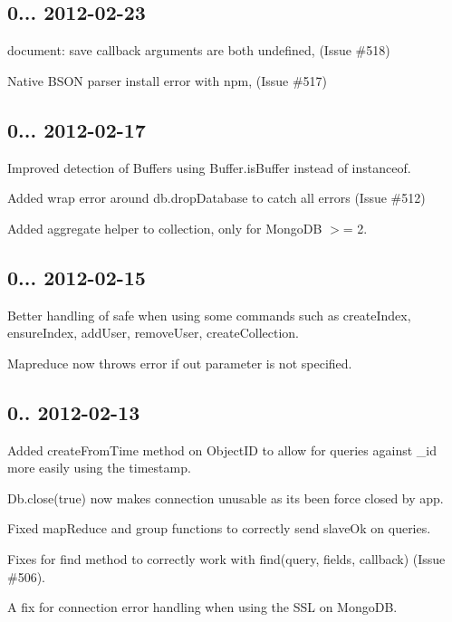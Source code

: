 \subsection*{0... 2012-\/02-\/23 }


\begin{DoxyItemize}
\item document\+: save callback arguments are both undefined, (Issue \#518)
\item Native B\+S\+ON parser install error with npm, (Issue \#517)
\end{DoxyItemize}

\subsection*{0... 2012-\/02-\/17 }


\begin{DoxyItemize}
\item Improved detection of Buffers using Buffer.\+is\+Buffer instead of instanceof.
\item Added wrap error around db.\+drop\+Database to catch all errors (Issue \#512)
\item Added aggregate helper to collection, only for Mongo\+DB $>$= 2.
\end{DoxyItemize}

\subsection*{0... 2012-\/02-\/15 }


\begin{DoxyItemize}
\item Better handling of safe when using some commands such as create\+Index, ensure\+Index, add\+User, remove\+User, create\+Collection.
\item Mapreduce now throws error if out parameter is not specified.
\end{DoxyItemize}

\subsection*{0.. 2012-\/02-\/13 }


\begin{DoxyItemize}
\item Added create\+From\+Time method on Object\+ID to allow for queries against \+\_\+id more easily using the timestamp.
\item Db.\+close(true) now makes connection unusable as it\textquotesingle{}s been force closed by app.
\item Fixed map\+Reduce and group functions to correctly send slave\+Ok on queries.
\item Fixes for find method to correctly work with find(query, fields, callback) (Issue \#506).
\item A fix for connection error handling when using the S\+SL on Mongo\+DB.
\end{DoxyItemize}

